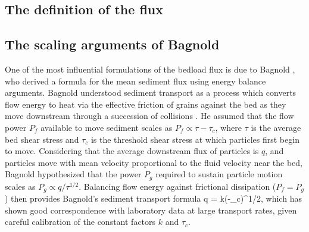 \subsection{The definition of the flux}


\subsection{The scaling arguments of Bagnold}

One of the most influential formulations of the bedload flux is due to Bagnold \citep{Bagnold1956,Bagnold1966}, who derived a formula for the mean sediment flux using energy balance arguments.
Bagnold understood sediment transport as a process which converts flow energy to heat via the effective friction \citep{Bagnold1954} of grains against the bed as they move downstream through a succession of collisions \citep{Bagnold1973}.
He assumed that the flow power $P_f$ available to move sediment scales as $P_f \propto \tau - \tau_c$, where $\tau$ is the average bed shear stress and $\tau_c$ is the threshold shear stress at which particles first begin to move. 
Considering that the average downstream flux of particles is $q$, and particles move with mean velocity proportional to the fluid velocity near the bed, Bagnold hypothesized that the power $P_g$ required to sustain particle motion scales as $P_g \propto q/\tau^{1/2}.$
 Balancing flow energy against frictional dissipation ($P_f = P_g$) then provides Bagnold's sediment transport formula
\be q = k(\tau-\tau_c)\tau^{1/2}, \label{eq:bagnold}\ee
which has shown good correspondence with laboratory data at large transport rates, given careful calibration of the constant factors $k$ and $\tau_c$.

